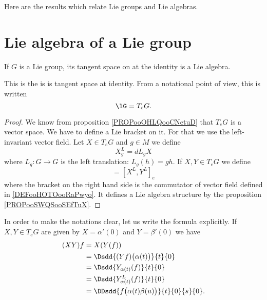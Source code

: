 

Here are the results which relate Lie groups and Lie algebras.

\section{Lie algebra of a Lie group}

\begin{propositionDef}      \label{DEFooKDCPooZOJsMD}
    If \( G\) is a Lie group, its tangent space on at the identity is a Lie algebra. 
    
    This is the  is is tangent space at identity. From a notational point of view, this is written
    \begin{equation}
        \lG=T_eG.
    \end{equation}
\end{propositionDef}

\begin{proof}
    We know from proposition \ref{PROPooOHLQooCNetuD} that \( T_eG\) is a vector space. We have to define a Lie bracket on it. For that we use the left-invariant vector field. Let \( X\in T_eG\) and \( g\in M\) we define
    \begin{equation}
        X^L_g=dL_gX
    \end{equation}
    where \( L_g\colon G\to G\) is the left translation: \( L_g(h)=gh\). If \( X,Y\in T_eG\) we define
    \begin{equation}
        [X,Y]=[X^L,Y^L]_e
    \end{equation}
    where the bracket on the right hand side is the commutator of vector field defined in \ref{DEFooHOTOooRaPwyo}. It defines a Lie algebra structure by the proposition \ref{PROPooSWQSooSEfTuX}.
\end{proof}

In order to make the notations clear, let us write the formula explicitly. If \( X,Y\in T_eG\) are given by \( X=\alpha'(0)\) and \( Y=\beta'(0)\) we have
\begin{subequations}        \label{SUBEQSooHKWMooQbeStl}
    \begin{align}
        (XY)f&=X(Y(f))\\
        &=\Dsdd{ (Yf)\big( \alpha(t) \big) }{t}{0}\\
        &=\Dsdd{ Y_{\alpha(t)}(f) }{t}{0}\\
        &=\Dsdd{ Y^L_{\alpha(t)}(f) }{t}{0}\\
        &=\DDsdd{ f\big( \alpha(t)\beta(u) \big) }{t}{0}{s}{0}.
    \end{align}
\end{subequations}


